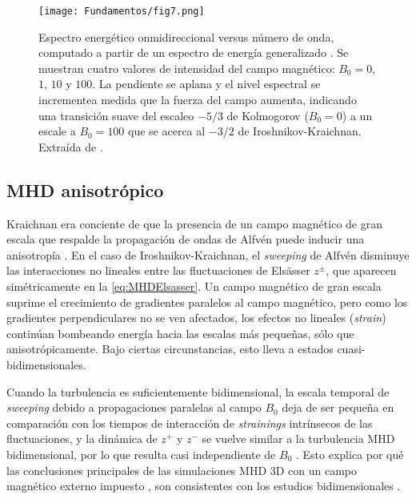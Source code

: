 \begin{figure}[h]
  \centering
  \texttt{[image: Fundamentos/fig7.png]}
  \caption{Espectro energético onmidireccional versus número de onda,
    computado a partir de un espectro de energía generalizado
    \cite{matthaeus_extended_1989}. Se muestran cuatro valores de
    intensidad del campo magnético: $B_0 = 0$, $1$, $10$ y $100$. La
    pendiente se aplana y el nivel espectral se incrementea medida que
    la fuerza del campo aumenta, indicando una transición suave del
    escaleo $-5/3$ de Kolmogorov ($B_0 = 0$) a un escale a $B_0 = 100$
    que se acerca al $-3/2$ de Iroshnikov-Kraichnan. Extraída de
    \cite{matthaeus_extended_1989}.}
  \label{fig:Omnidirectional_vs_k}
\end{figure}



\subsection{MHD anisotrópico}
Kraichnan era conciente de que la presencia de un campo magnético de
gran escala que respalde la propagación de ondas de Alfv\'en puede
inducir una anisotropía  \cite{galtier_weak_2000}. En el caso de
Iroshnikov-Kraichnan, el \textit{sweeping} de Alfv\'en disminuye las
interacciones no lineales entre las fluctuaciones de Els\"asser
$z^\pm$, que aparecen simétricamente en la \cref{eq:MHDElsasser}. Un
campo magnético de gran escala suprime el crecimiento de gradientes
paralelos al campo magnético, pero como los gradientes perpendiculares
no se ven afectados, los efectos no lineales (\textit{strain})
continúan bombeando energía hacia las escalas más pequeñas, sólo que
anisotrópicamente. Bajo ciertas circunstancias, esto lleva a estados
cuasi-bidimensionales.

Cuando la turbulencia es suficientemente bidimensional, la escala
temporal de \textit{sweeping} debido a propagaciones paralelas al
campo $B_0$ deja de ser pequeña en comparación con los tiempos de
interacción de \textit{strainings} intrínsecos de las fluctuaciones, y
la dinámica de $z^+$ y $z^-$ se vuelve similar a la turbulencia MHD
bidimensional, por lo que resulta casi independiente de $B_0$
\cite{chen_inhibition_1997, hossain_phenomenology_1995}. Esto explica
por qué las conclusiones principales de las simulaciones MHD 3D con un
campo magnético externo impuesto \cite{oughton_influence_1994}, son
consistentes con los estudios bidimensionales
\cite{shebalin_anisotropy_1983}.

